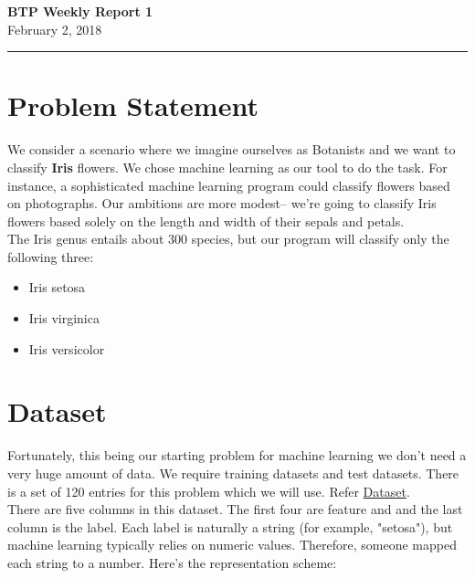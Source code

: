 \documentclass[11pt,letterpaper]{article}
\begin{document}
\pagestyle{plain}

\begin{center}\vspace{-1cm}
\textbf{ \large BTP Weekly Report 1}\\
February 2, 2018
\end{center}

 
\rule{\linewidth}{0.1mm}
\bigskip

\section{Problem Statement}
We consider a scenario where we imagine ourselves as Botanists and we want to classify \textbf{Iris} flowers. We chose machine learning as our tool to do the task.  For instance, a sophisticated machine learning program could classify flowers based on photographs. Our ambitions are more modest-- we're going to classify Iris flowers based solely on the length and width of their sepals and petals.\\

\noindent
The Iris genus entails about 300 species, but our program will classify only the following three:

\begin{itemize}
\item Iris setosa
\item Iris virginica
\item Iris versicolor
\end{itemize}

\bigskip

\section{Dataset}
Fortunately, this being our starting problem for machine learning we don't need a very huge amount of data. We require training datasets and test datasets. There is a set of 120 entries for this problem which we will use. Refer \href{https://en.wikipedia.org/wiki/Iris_flower_data_set#Data_set}{Dataset}. \\

\noindent
There are five columns in this dataset. The first four are feature and and the last column is the label. Each label is naturally a string (for example, "setosa"), but machine learning typically relies on numeric values. Therefore, someone mapped each string to a number. Here's the representation scheme:
\end{document}
